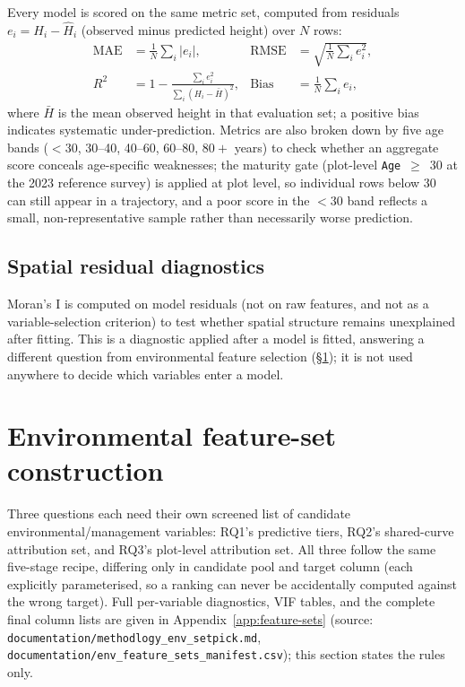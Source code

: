 Every model is scored on the same metric set, computed from residuals $e_i = H_i - \hat H_i$
(observed minus predicted height) over $N$ rows:
\begin{align*}
\text{MAE} &= \frac{1}{N}\sum_i |e_i|, &
\text{RMSE} &= \sqrt{\frac{1}{N}\sum_i e_i^2}, \\
R^2 &= 1 - \frac{\sum_i e_i^2}{\sum_i (H_i - \bar H)^2}, &
\text{Bias} &= \frac{1}{N}\sum_i e_i,
\end{align*}
where $\bar H$ is the mean observed height in that evaluation set; a positive bias indicates
systematic under-prediction. Metrics are also broken down by five age bands ($<30$, 30--40,
40--60, 60--80, $80+$ years) to check whether an aggregate score conceals age-specific weaknesses;
the maturity gate (plot-level \texttt{Age}~$\geq$~30 at the 2023 reference survey) is applied at
plot level, so individual rows below 30 can still appear in a trajectory, and a poor score in the
$<30$ band reflects a small, non-representative sample rather than necessarily worse prediction.

\subsection{Spatial residual diagnostics}

Moran's I is computed on model residuals (not on raw features, and not as a variable-selection
criterion) to test whether spatial structure remains unexplained after fitting. This is a
diagnostic applied after a model is fitted, answering a different question from environmental
feature selection (\S\ref{sec:feature-sets}); it is not used anywhere to decide which variables
enter a model.

\section{Environmental feature-set construction}
\label{sec:feature-sets}

Three questions each need their own screened list of candidate environmental/management
variables: RQ1's predictive tiers, RQ2's shared-curve attribution set, and RQ3's plot-level
attribution set. All three follow the same five-stage recipe, differing only in candidate pool
and target column (each explicitly parameterised, so a ranking can never be accidentally computed
against the wrong target). Full per-variable diagnostics, VIF tables, and the complete final
column lists are given in Appendix~\ref{app:feature-sets}
(source: \texttt{documentation/methodlogy\_env\_setpick.md},
\texttt{documentation/env\_feature\_sets\_manifest.csv}); this section states the rules only.

